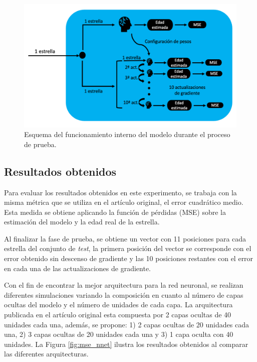 \begin{figure}[H]
\begin{center}
 \includegraphics[width=0.8\linewidth]{Figuras/MAML/maml_core_test.pdf}
\end{center}
\caption{Esquema del funcionamiento interno del modelo durante el proceso de prueba.}
 \label{fig:core_maml_test}
\end{figure}


\subsection{Resultados obtenidos} 
\label{sub:maml_result}
Para evaluar los resultados obtenidos en este experimento, se trabaja con la misma métrica que se utiliza en el artículo original, el error cuadrático medio. Esta medida se obtiene aplicando la función de pérdidas (MSE) sobre la estimación del modelo y la edad real de la estrella. 

Al finalizar la fase de prueba, se obtiene un vector con 11 posiciones para cada estrella del conjunto de \emph{test}, la primera posición del vector se corresponde con el error obtenido sin descenso de gradiente y las 10 posiciones restantes con el error en cada una de las actualizaciones de gradiente.


Con el fin de encontrar la mejor arquitectura para la red neuronal, se realizan diferentes simulaciones variando la composición en cuanto al número de capas ocultas del modelo y el número de unidades de cada capa. La arquitectura publicada en el artículo original esta compuesta por 2 capas ocultas de 40 unidades cada una, además, se propone: 1) 2 capas ocultas de 20 unidades cada una, 2) 3 capas ocultas de 20 unidades cada una y 3) 1 capa oculta con 40 unidades.
La Figura \ref{fig:mse_nnet} ilustra los resultados obtenidos al comparar las diferentes arquitecturas.

